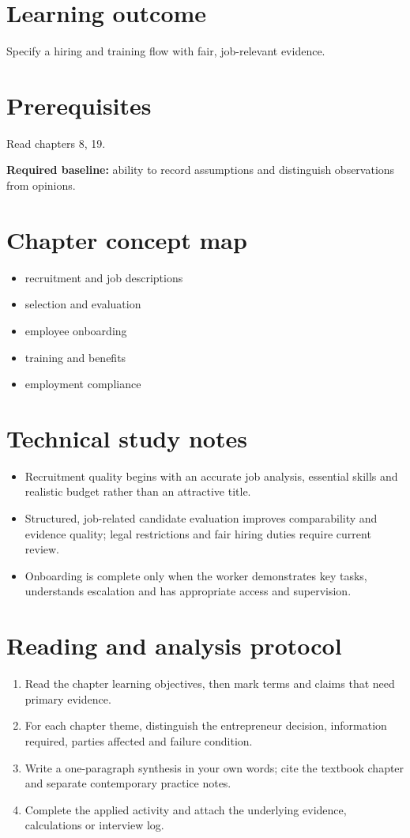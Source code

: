 \documentclass[11pt,letterpaper]{article}
\begin{document}
\SuiteOpen
\section{Learning outcome}
Specify a hiring and training flow with fair, job-relevant evidence.
\section{Prerequisites}
Read chapters 8, 19.\par\textbf{Required baseline:} ability to record assumptions and distinguish observations from opinions.
\section{Chapter concept map}
\begin{itemize}[leftmargin=*,itemsep=3pt]
\item recruitment and job descriptions
\item selection and evaluation
\item employee onboarding
\item training and benefits
\item employment compliance
\end{itemize}

\section{Technical study notes}
\begin{itemize}[leftmargin=*,itemsep=3pt]
\item Recruitment quality begins with an accurate job analysis, essential skills and realistic budget rather than an attractive title.
\item Structured, job-related candidate evaluation improves comparability and evidence quality; legal restrictions and fair hiring duties require current review.
\item Onboarding is complete only when the worker demonstrates key tasks, understands escalation and has appropriate access and supervision.
\end{itemize}

\section{Reading and analysis protocol}
\begin{enumerate}[leftmargin=*,itemsep=5pt]
\item Read the chapter learning objectives, then mark terms and claims that need primary evidence.
\item For each chapter theme, distinguish the entrepreneur decision, information required, parties affected and failure condition.
\item Write a one-paragraph synthesis in your own words; cite the textbook chapter and separate contemporary practice notes.
\item Complete the applied activity and attach the underlying evidence, calculations or interview log.
\end{enumerate}
\end{document}
